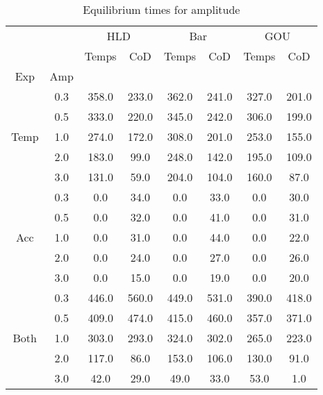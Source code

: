 \begin{table}[h]
\centering
\caption{Equilibrium times for amplitude}
\label{table:5}
\begin{tabular}{cccccccc}
\toprule
{} & {} & \multicolumn{2}{c}{HLD} & \multicolumn{2}{c}{Bar} & \multicolumn{2}{c}{GOU} \\
{} & {} & {Temps} & {CoD} & {Temps} & {CoD} & {Temps} & {CoD} \\
{Exp} & {Amp} & {} & {} & {} & {} & {} & {} \\
\midrule
\multirow[c]{5}{*}{Temp} & 0.3 & 358.0 & 233.0 & 362.0 & 241.0 & 327.0 & 201.0 \\
 & 0.5 & 333.0 & 220.0 & 345.0 & 242.0 & 306.0 & 199.0 \\
 & 1.0 & 274.0 & 172.0 & 308.0 & 201.0 & 253.0 & 155.0 \\
 & 2.0 & 183.0 & 99.0 & 248.0 & 142.0 & 195.0 & 109.0 \\
 & 3.0 & 131.0 & 59.0 & 204.0 & 104.0 & 160.0 & 87.0 \\
\multirow[c]{5}{*}{Acc} & 0.3 & 0.0 & 34.0 & 0.0 & 33.0 & 0.0 & 30.0 \\
 & 0.5 & 0.0 & 32.0 & 0.0 & 41.0 & 0.0 & 31.0 \\
 & 1.0 & 0.0 & 31.0 & 0.0 & 44.0 & 0.0 & 22.0 \\
 & 2.0 & 0.0 & 24.0 & 0.0 & 27.0 & 0.0 & 26.0 \\
 & 3.0 & 0.0 & 15.0 & 0.0 & 19.0 & 0.0 & 20.0 \\
\multirow[c]{5}{*}{Both} & 0.3 & 446.0 & 560.0 & 449.0 & 531.0 & 390.0 & 418.0 \\
 & 0.5 & 409.0 & 474.0 & 415.0 & 460.0 & 357.0 & 371.0 \\
 & 1.0 & 303.0 & 293.0 & 324.0 & 302.0 & 265.0 & 223.0 \\
 & 2.0 & 117.0 & 86.0 & 153.0 & 106.0 & 130.0 & 91.0 \\
 & 3.0 & 42.0 & 29.0 & 49.0 & 33.0 & 53.0 & 1.0 \\
\bottomrule
\end{tabular}
\end{table}
